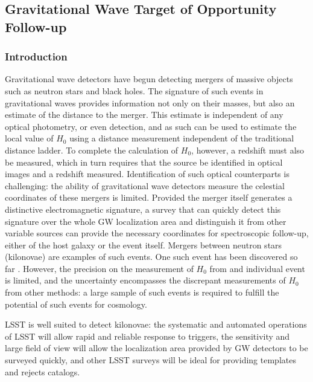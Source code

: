 \subsection{Gravitational Wave Target of Opportunity Follow-up}

\subsubsection{Introduction}

Gravitational wave detectors have begun detecting mergers of massive objects such as neutron stars and black holes. The signature of such events in gravitational waves provides information not only on their masses, but also an estimate of the distance to the merger. This estimate is independent of any optical photometry, or even detection, and as such can be used to estimate the local value of $H_0$ using a distance measurement independent of the traditional distance ladder. To complete the calculation of $H_0$, however, a redshift must also be measured, which in turn requires that the source be identified in optical images and a redshift measured. Identification of such optical counterparts is challenging: the ability of gravitational wave detectors measure the celestial coordinates of these mergers is limited. Provided the merger itself generates a distinctive electromagnetic signature, a survey that can quickly detect this signature over the whole GW localization area and distinguish it from other variable sources can provide the necessary coordinates for spectroscopic follow-up, either of the host galaxy or the event itself. Mergers between neutron stars (kilonovae) are examples of such events. One such event has been discovered so far \citep{TheLIGOScientificCollaboration2017, 2017ApJ...848L..12A}. However, the precision on the measurement of $H_0$ from and individual event is limited, and the uncertainty encompasses the discrepant measurements of $H_0$ from other methods: a large sample of such events is required to fulfill the potential of such events for cosmology.

LSST is well suited to detect kilonovae: the systematic and automated operations of LSST will allow rapid and reliable response to triggers, the sensitivity and large field of view will allow the localization area provided by GW detectors to be surveyed quickly, and other LSST surveys will be ideal for providing templates and rejects catalogs.


